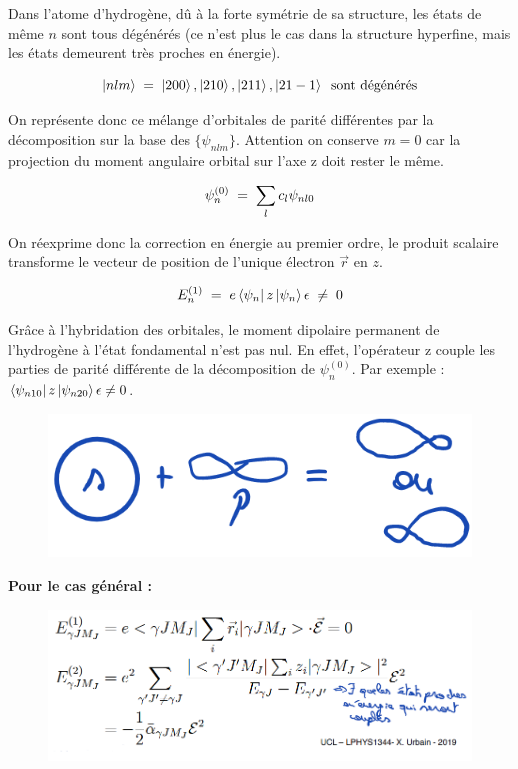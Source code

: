 Dans l'atome d'hydrogène, dû à la forte symétrie de sa structure, les états de même $n$ sont tous dégénérés (ce n'est plus le cas dans la structure hyperfine, mais les états demeurent très proches en énergie).

\[
    \ket{nlm}\; = \; \ket{200},\ket{210},\ket{211},\ket{21-1}\;\;\text{sont dégénérés}
\]

On représente donc ce mélange d'orbitales de parité différentes par la décomposition sur la base des $\{\psi_{nlm}\}$. Attention on conserve $m = 0$ car la projection du moment angulaire orbital sur l'axe z doit rester le même. %

\[
    \psi_n^{(0)} \; = \; \sum_l c_l \psi_{nl0}
\]

On réexprime donc la correction en énergie au premier ordre, le produit scalaire transforme le vecteur de position de l'unique électron $\vec{r}$ en $z$.

\[
    E_n^{(1)} \; = \; e\bra{\psi_n}z\ket{\psi_n}\epsilon \;\neq \; 0
\]

Grâce à l'hybridation des orbitales, le moment dipolaire permanent de l'hydrogène à l'état fondamental n'est pas nul. En effet, l'opérateur z couple les parties de parité différente de la décomposition de $\psi_n^{(0)}$. Par exemple : $\bra{\psi_{n10}}z\ket{\psi_{n20}}\epsilon \neq 0$.\\

\begin{figure}[tph]
    \centering
    \includegraphics[scale=0.5]{Images2/hybridation.png}
\end{figure}

\textbf{Pour le cas général :}\\

\begin{figure}[tph]
    \centering
    \includegraphics[scale=0.8]{Images2/correcordre.PNG}
\end{figure}

